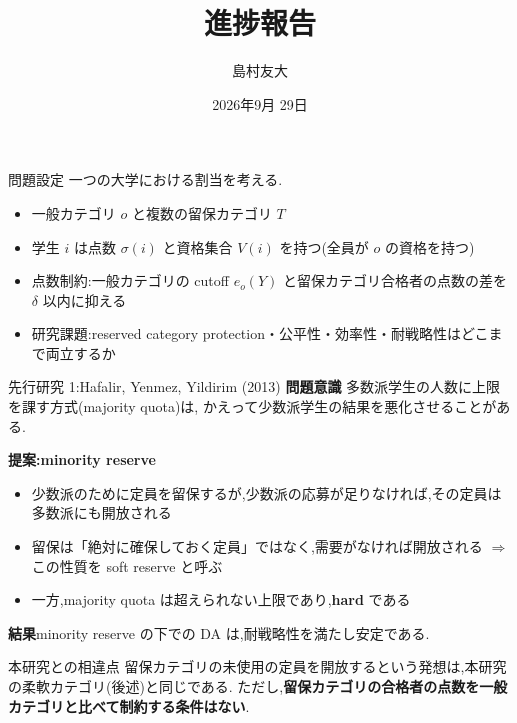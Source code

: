 \documentclass[aspectratio=43,11pt]{beamer}
\title{進捗報告}
\date{2026年9月 29日}
\author{島村友大}
\begin{document}
\begin{frame}[plain]
  \titlepage
\end{frame}

\begin{frame}{問題設定}
一つの大学における割当を考える.
\begin{itemize}
  \item 一般カテゴリ $o$ と複数の留保カテゴリ $T$
  \item 学生 $i$ は点数 $\sigma(i)$ と資格集合 $V(i)$ を持つ(全員が $o$ の資格を持つ)
  \item \alert{点数制約:一般カテゴリの cutoff $e_o(Y)$ と留保カテゴリ合格者の点数の差を $\delta$ 以内に抑える}
  \item 研究課題:reserved category protection・公平性・効率性・耐戦略性はどこまで両立するか
\end{itemize}
\end{frame}

\begin{frame}{先行研究 1:Hafalir, Yenmez, Yildirim (2013)}
\small
\textbf{問題意識}\quad
多数派学生の人数に上限を課す方式(majority quota)は,
かえって少数派学生の結果を悪化させることがある.

\medskip
\textbf{提案:minority reserve}
\begin{itemize}
  \item 少数派のために定員を留保するが,\alert{少数派の応募が足りなければ,その定員は多数派にも開放される}
  \item 留保は「絶対に確保しておく定員」ではなく,需要がなければ開放される
        $\Rightarrow$ この性質を soft reserve と呼ぶ
  \item 一方,majority quota は超えられない上限であり,\textbf{hard} である
\end{itemize}

\medskip
\textbf{結果}\quad minority reserve の下での DA は,耐戦略性を満たし安定である.

\medskip
\begin{block}{本研究との相違点}
  留保カテゴリの未使用の定員を開放するという発想は,本研究の柔軟カテゴリ(後述)と同じである.
  ただし,\textbf{留保カテゴリの合格者の点数を一般カテゴリと比べて制約する条件はない}.
\end{block}
\end{frame}
\end{document}
